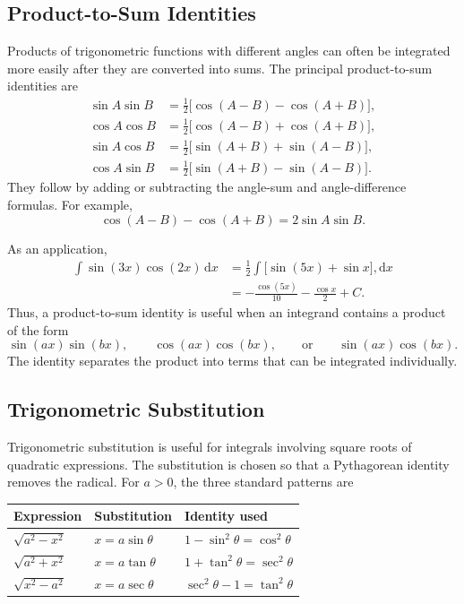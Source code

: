 \subsection{Product-to-Sum Identities}

Products of trigonometric functions with different angles can often be
integrated more easily after they are converted into sums.  The principal
product-to-sum identities are
\begin{align*}
    \sin A\sin B
        &=\frac12\bigl[\cos(A-B)-\cos(A+B)\bigr],\\
    \cos A\cos B
        &=\frac12\bigl[\cos(A-B)+\cos(A+B)\bigr],\\
    \sin A\cos B
        &=\frac12\bigl[\sin(A+B)+\sin(A-B)\bigr],\\
    \cos A\sin B
        &=\frac12\bigl[\sin(A+B)-\sin(A-B)\bigr].
\end{align*}
They follow by adding or subtracting the angle-sum and angle-difference
formulas.  For example,
\[
    \cos(A-B)-\cos(A+B)=2\sin A\sin B.
\]

As an application,
\begin{align*}
    \int\sin(3x)\cos(2x)\,\mathrm{d}x
    &=\frac12\int\bigl[\sin(5x)+\sin x\bigr],\mathrm{d}x \\
    &=-\frac{\cos(5x)}{10}-\frac{\cos x}{2}+C.
\end{align*}
Thus, a product-to-sum identity is useful when an integrand contains a
product of the form
\[
    \sin(ax)\sin(bx),
    \qquad
    \cos(ax)\cos(bx),
    \qquad\text{or}\qquad
    \sin(ax)\cos(bx).
\]
The identity separates the product into terms that can be integrated
individually.

\subsection{Trigonometric Substitution}

Trigonometric substitution is useful for integrals involving square roots of
quadratic expressions.  The substitution is chosen so that a Pythagorean
identity removes the radical.  For \(a>0\), the three standard patterns are
\begin{center}
    \begin{tabular}{lll}
        \toprule
        Expression & Substitution & Identity used \\
        \midrule
        \(\sqrt{a^2-x^2}\)
            & \(x=a\sin\theta\)
            & \(1-\sin^2\theta=\cos^2\theta\) \\
        \(\sqrt{a^2+x^2}\)
            & \(x=a\tan\theta\)
            & \(1+\tan^2\theta=\sec^2\theta\) \\
        \(\sqrt{x^2-a^2}\)
            & \(x=a\sec\theta\)
            & \(\sec^2\theta-1=\tan^2\theta\) \\
        \bottomrule
    \end{tabular}
\end{center}

